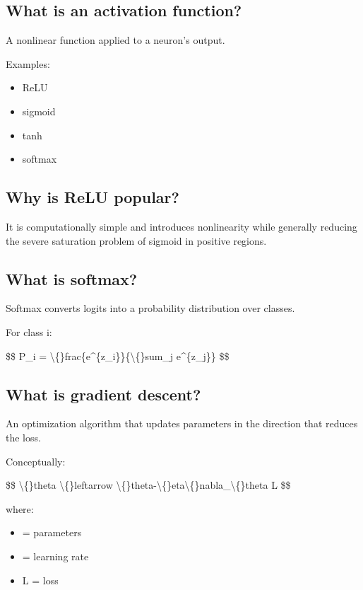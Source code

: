 \subsection{What is an activation function?}

A nonlinear function applied to a neuron's output.

Examples:

\begin{itemize}
  \item ReLU
  \item sigmoid
  \item tanh
  \item softmax
\end{itemize}

\medskip

\subsection{Why is ReLU popular?}

It is computationally simple and introduces nonlinearity while generally reducing the severe saturation problem of sigmoid in positive regions.

\medskip

\subsection{What is softmax?}

Softmax converts logits into a probability distribution over classes.

For class i:

\$\$
P\_i = \textbackslash\{\}frac\{e\textasciicircum{}\{z\_i\}\}\{\textbackslash\{\}sum\_j e\textasciicircum{}\{z\_j\}\}
\$\$

\medskip

\subsection{What is gradient descent?}

An optimization algorithm that updates parameters in the direction that reduces the loss.

Conceptually:

\$\$
\textbackslash\{\}theta \textbackslash\{\}leftarrow \textbackslash\{\}theta-\textbackslash\{\}eta\textbackslash\{\}nabla\_\textbackslash\{\}theta L
\$\$

where:

\begin{itemize}
  \item  = parameters
  \item  = learning rate
  \item L = loss
\end{itemize}

